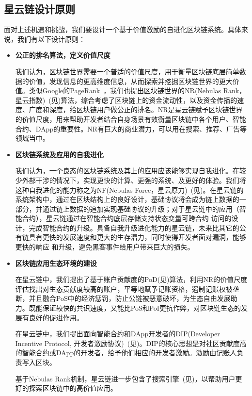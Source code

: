 \subsection{星云链设计原则}
面对上述机遇和挑战，我们要设计一个基于价值激励的自进化区块链系统。具体来说，我们有以下设计原则：
\begin{itemize}
	\item \textbf{公正的排名算法，定义价值尺度}

我们认为，区块链世界需要一个普适的价值尺度，用于衡量区块链底层简单数据的价值，发现信息的更高维度信息，从而探索并挖掘区块链世界的更大价值。类似Google的PageRank~\cite{Brin2010}\cite{page1999pagerank}，我们也提出区块链世界的NR(Nebulas Rank，星云指数)~(见)算法，综合考虑了区块链上的资金流动性，以及资金传播的速度、广度和深度，给区块链用户做公正的排名。NR是星云链赋予区块链世界的价值尺度，用来帮助开发者结合自身场景有效衡量区块链中各个用户、智能合约、DApp的重要性。NR有巨大的商业潜力，可以用在搜索、推荐、广告等领域当中。

  \item \textbf{区块链系统及应用的自我进化}

    我们认为，一个良态的区块链系统及其上的应用应该能够实现自我进化。在较少外部干涉的情况下，实现更快的计算、更强的系统、及更好的体验。我们将这种自我进化的能力称之为NF(Nebulas Force，星云原力)~(见)。在星云链的系统架构中，通过在区块结构上的良好设计，基础协议将会成为链上数据的一部分，并通过链上数据的追加实现基础协议的升级；对于星云链中的应用（智能合约），星云链通过在智能合约底层存储支持状态变量可跨合约
    访问的设计，完成智能合约的升级。具备自我升级进化能力的星云链，未来比其它的公有链具有更快的发展速度和更大的生存潜力，同时使得开发者面对漏洞，能够更快的响应 和升级，避免黑客事件给用户带来巨大的损失。

\item \textbf{区块链应用生态环境的建设}

在星云链中，我们提出了基于账户贡献度的PoD(见)算法，利用NR的价值尺度评估找出对生态贡献度较高的账户，平等地赋予记账资格，遏制记账权被垄断，并且融合PoS中的经济惩罚，防止公链被恶意破坏，为生态自由发展助力。既能保证较快的共识速度，又能比PoS和PoI更抗作弊，对区块链生态的发展有良好的促进作用。


在星云链中，我们提出面向智能合约和DApp开发者的DIP(Developer Incentive Protocol, 开发者激励协议)~(见)。DIP的核心思想是对社区贡献度高的智能合约或DApp的开发者，给予他们相应的开发者激励。激励由记账人负责写入区块。

基于Nebulas Rank机制，星云链进一步包含了搜索引擎~(见)，以帮助用户更好的探索区块链中的高价值应用。

\end{itemize}


